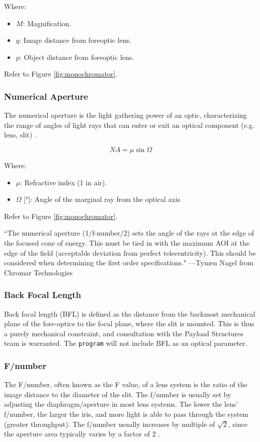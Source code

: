 \documentclass{article}
\begin{document}
Where:
\begin{itemize}
    \item $M$: Magnification.
    \item $q$: Image distance from foreoptic lens.
    \item $p$: Object distance from foreoptic lens.
\end{itemize}
Refer to Figure \ref{fig:monochromator}.

\subsubsection{Numerical Aperture}
The numerical aperture is the light gathering power of an optic, characterizing the range of angles of light rays that can enter or exit an optical component (e.g. lens, slit) \cite{Horiba_monochromator}.

\begin{equation} \label{eq:numerical-aperture}
    NA = \mu\sin\Omega
\end{equation}

Where:
\begin{itemize}[label={}]
    \item $\mu$: Refractive index (1 in air).
    \item $\Omega$ [\si{\degree}]: Angle of the marginal ray from the optical axis
\end{itemize}
Refer to Figure \ref{fig:monochromator}.

``The numerical aperture (1/f-number/2) sets the angle of the rays at the edge of the focused cone of energy. This must be tied in with the maximum AOI at the edge of the field (acceptable deviation from perfect telecentricity). This should be considered when determining the first order specifications." ---Tymen Nagel from Chromar Technologies

\subsubsection{Back Focal Length}
Back focal length (BFL) is defined as the distance from the backmost mechanical plane of the fore-optics to the focal plane, where the slit is mounted. This is thus a purely mechanical constraint, and consultation with the Payload Structures team is warranted. The \texttt{program} will not include BFL as an optical parameter.

\subsubsection{F/number}
The F/number, often known as the F value, of a lens system is the ratio of the image distance to the diameter of the slit. The f/number is usually set by adjusting the diaphragm/aperture in most lens systems. The lower the lens’ f/number, the larger the iris, and more light is able to pass through the system (greater throughput). The f/number usually increases by multiple of $\sqrt{2}$, since the aperture area typically varies by a factor of 2 \cite{Hollows_undated}.
\end{document}
